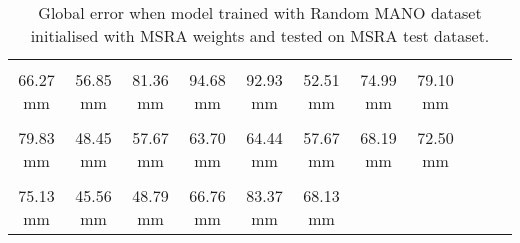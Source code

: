 \begin{table}[!ht]
    \begin{tabular}{|c|c|c|c|c|c|c|c|c|c|c|}
    \hline
    \cellcolor[HTML]{ff8000}{\bfseries Wrist} & \cellcolor[HTML]{ffbf00}{\bfseries IMCP} & \cellcolor[HTML]{ff2500}{\bfseries IPIP} & \cellcolor[HTML]{ff0000}{\bfseries IDIP} & \cellcolor[HTML]{ff0000}{\bfseries ITIP} & \cellcolor[HTML]{ffbf00}{\bfseries MMCP} & \cellcolor[HTML]{ff7500}{\bfseries MPIP} & \cellcolor[HTML]{ff7500}{\bfseries MDIP}  \\
    \cellcolor[HTML]{ff8000}$\,\,\,$66.27 mm & \cellcolor[HTML]{ffbf00}$\,\,\,$56.85 mm & \cellcolor[HTML]{ff2500}$\,\,\,$81.36 mm & \cellcolor[HTML]{ff0000}$\,\,\,$94.68 mm & \cellcolor[HTML]{ff0000}$\,\,\,$92.93 mm & \cellcolor[HTML]{ffbf00}$\,\,\,$52.51 mm & \cellcolor[HTML]{ff7500}$\,\,\,$74.99 mm & \cellcolor[HTML]{ff7500}$\,\,\,$79.10 mm\\
    \hline
    \cellcolor[HTML]{ff7500}{\bfseries MTIP} & \cellcolor[HTML]{ffff00}{\bfseries RMCP} & \cellcolor[HTML]{ffbf00}{\bfseries RPIP} & \cellcolor[HTML]{ff8000}{\bfseries RDIP} & \cellcolor[HTML]{ff8000}{\bfseries RTIP} & \cellcolor[HTML]{ffbf00}{\bfseries PMCP} & \cellcolor[HTML]{ff8000}{\bfseries PPIP} & \cellcolor[HTML]{ff7500}{\bfseries PDIP}  \\
    \cellcolor[HTML]{ff7500}$\,\,\,$79.83 mm & \cellcolor[HTML]{ffff00}$\,\,\,$48.45 mm & \cellcolor[HTML]{ffbf00}$\,\,\,$57.67 mm & \cellcolor[HTML]{ff8000}$\,\,\,$63.70 mm & \cellcolor[HTML]{ff8000}$\,\,\,$64.44 mm & \cellcolor[HTML]{ffbf00}$\,\,\,$57.67 mm & \cellcolor[HTML]{ff8000}$\,\,\,$68.19 mm & \cellcolor[HTML]{ff7500}$\,\,\,$72.50 mm\\
    \hline
    \cellcolor[HTML]{ff7500}{\bfseries PTIP} & \cellcolor[HTML]{ffff00}{\bfseries TMCP} & \cellcolor[HTML]{ffff00}{\bfseries TPIP} & \cellcolor[HTML]{ff8000}{\bfseries PDIP} & \cellcolor[HTML]{ff2500}{\bfseries TTIP} & \cellcolor[HTML]{ff8000}{\bfseries Average}  \\
    \cellcolor[HTML]{ff7500}$\,\,\,$75.13 mm & \cellcolor[HTML]{ffff00}$\,\,\,$45.56 mm & \cellcolor[HTML]{ffff00}$\,\,\,$48.79 mm & \cellcolor[HTML]{ff8000}$\,\,\,$66.76 mm & \cellcolor[HTML]{ff2500}$\,\,\,$83.37 mm & \cellcolor[HTML]{ff8000}$\,\,\,$68.13 mm \\
    \cline{1-6}
    \end{tabular}
    \caption{Global error when model trained with Random MANO dataset initialised with MSRA weights and tested on MSRA test dataset.}
    \label{tb:omag}
    \end{table}
